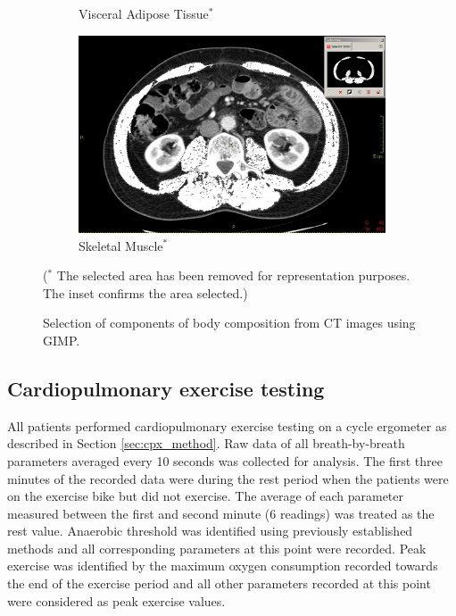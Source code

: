\begin{figure}[htbp]
\begin{subfigure}{0.45\textwidth}
		\caption{Visceral Adipose Tissue$^*$}
		\label{fig:bc_ct_vat}
	\end{subfigure}
	\begin{subfigure}{0.45\textwidth}
		\centering
		\includegraphics[width=\textwidth]{Figures/bc_ct_sm}
		\caption{Skeletal Muscle$^*$}
		\label{fig:bc_ct_sm}
	\end{subfigure}
	
	\caption{Selection of components of body composition from CT images using GIMP.}($^*$ The selected area has been removed for representation purposes. The inset confirms the area selected.)
	\label{fig:bc_ct_gimp}
	
\end{figure}

\subsection{Cardiopulmonary exercise testing}
All patients performed cardiopulmonary exercise testing on a cycle ergometer as described in Section \ref{sec:cpx_method}. Raw data of all breath-by-breath parameters averaged every 10 seconds was collected for analysis. The first three minutes of the recorded data were during the rest period when the patients were on the exercise bike but did not exercise. The average of each parameter measured between the first and second minute (6 readings) was treated as the rest value. Anaerobic threshold was identified using previously established methods and all corresponding parameters at this point were recorded.\parencite{beaver_new_1986,sue_metabolic_1988} Peak exercise was identified by the maximum oxygen consumption recorded towards the end of the exercise period and all other parameters recorded at this point were considered as peak exercise values. 

